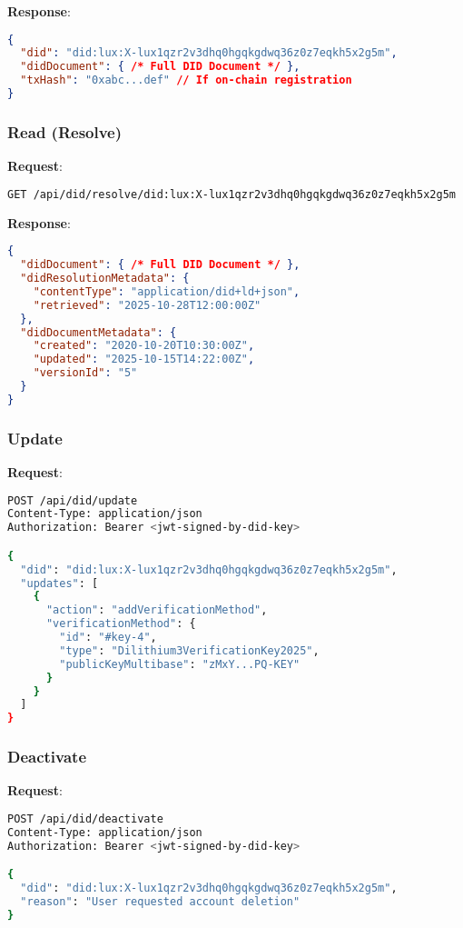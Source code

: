 \documentclass[11pt,a4paper]{article}
\begin{document}
\textbf{Response}:
\begin{lstlisting}[language=json]
{
  "did": "did:lux:X-lux1qzr2v3dhq0hgqkgdwq36z0z7eqkh5x2g5m",
  "didDocument": { /* Full DID Document */ },
  "txHash": "0xabc...def" // If on-chain registration
}
\end{lstlisting}

\subsubsection{Read (Resolve)}

\textbf{Request}:
\begin{lstlisting}[language=bash]
GET /api/did/resolve/did:lux:X-lux1qzr2v3dhq0hgqkgdwq36z0z7eqkh5x2g5m
\end{lstlisting}

\textbf{Response}:
\begin{lstlisting}[language=json]
{
  "didDocument": { /* Full DID Document */ },
  "didResolutionMetadata": {
    "contentType": "application/did+ld+json",
    "retrieved": "2025-10-28T12:00:00Z"
  },
  "didDocumentMetadata": {
    "created": "2020-10-20T10:30:00Z",
    "updated": "2025-10-15T14:22:00Z",
    "versionId": "5"
  }
}
\end{lstlisting}

\subsubsection{Update}

\textbf{Request}:
\begin{lstlisting}[language=bash]
POST /api/did/update
Content-Type: application/json
Authorization: Bearer <jwt-signed-by-did-key>

{
  "did": "did:lux:X-lux1qzr2v3dhq0hgqkgdwq36z0z7eqkh5x2g5m",
  "updates": [
    {
      "action": "addVerificationMethod",
      "verificationMethod": {
        "id": "#key-4",
        "type": "Dilithium3VerificationKey2025",
        "publicKeyMultibase": "zMxY...PQ-KEY"
      }
    }
  ]
}
\end{lstlisting}

\subsubsection{Deactivate}

\textbf{Request}:
\begin{lstlisting}[language=bash]
POST /api/did/deactivate
Content-Type: application/json
Authorization: Bearer <jwt-signed-by-did-key>

{
  "did": "did:lux:X-lux1qzr2v3dhq0hgqkgdwq36z0z7eqkh5x2g5m",
  "reason": "User requested account deletion"
}
\end{lstlisting}
\end{document}
